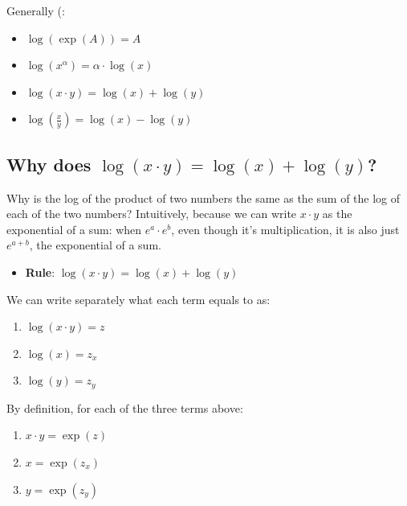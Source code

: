 \documentclass[
]{book}
\providecommand{\tightlist}{%
  \setlength{\itemsep}{0pt}\setlength{\parskip}{0pt}}
\begin{document}
Generally (:

\begin{itemize}
\item
  \(\displaystyle \log (\exp (A))=A\)
\item
  \(\displaystyle \log (x^{\alpha } )=\alpha \cdot \log (x)\)
\item
  \(\displaystyle \log (x\cdot y)=\log (x)+\log (y)\)
\item
  \(\displaystyle \log (\frac{x}{y})=\log (x)-\log (y)\)
\end{itemize}

\hypertarget{why-does-log-xcdot-ylog-xlog-y}{%
\subsection{\texorpdfstring{Why does \(\log (x\cdot y)=\log (x)+\log (y)\)?}{Why does \textbackslash log (x\textbackslash cdot y)=\textbackslash log (x)+\textbackslash log (y)?}}\label{why-does-log-xcdot-ylog-xlog-y}}

Why is the log of the product of two numbers the same as the sum of the
log of each of the two numbers? Intuitively, because we can write
\(x\cdot y\) as the exponential of a sum: when \(e^a \cdot e^b\), even
though it's multiplication, it is also just \(e^{a+b}\), the exponential
of a sum.

\begin{itemize}
\tightlist
\item
  \textbf{Rule}: \(\log (x\cdot y)=\log (x)+\log (y)\)
\end{itemize}

We can write separately what each term equals to as:

\begin{enumerate}
\def\labelenumi{\arabic{enumi}.}
\item
  \(\displaystyle \log (x\cdot y)=z\)
\item
  \(\displaystyle \log (x)=z_x\)
\item
  \(\displaystyle \log (y)=z_y\)
\end{enumerate}

By definition, for each of the three terms above:

\begin{enumerate}
\def\labelenumi{\arabic{enumi}.}
\item
  \(\displaystyle x\cdot y=\exp (z)\)
\item
  \(\displaystyle x=\exp (z_x )\)
\item
  \(\displaystyle y=\exp (z_y )\)
\end{enumerate}
\end{document}
